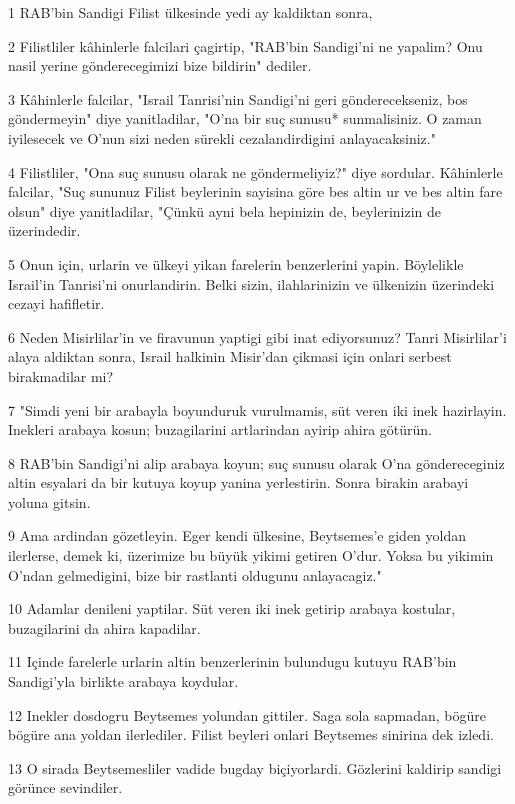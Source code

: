 \par 1 RAB'bin Sandigi Filist ülkesinde yedi ay kaldiktan sonra,
\par 2 Filistliler kâhinlerle falcilari çagirtip, "RAB'bin Sandigi'ni ne yapalim? Onu nasil yerine gönderecegimizi bize bildirin" dediler.
\par 3 Kâhinlerle falcilar, "Israil Tanrisi'nin Sandigi'ni geri gönderecekseniz, bos göndermeyin" diye yanitladilar, "O'na bir suç sunusu* sunmalisiniz. O zaman iyilesecek ve O'nun sizi neden sürekli cezalandirdigini anlayacaksiniz."
\par 4 Filistliler, "Ona suç sunusu olarak ne göndermeliyiz?" diye sordular. Kâhinlerle falcilar, "Suç sununuz Filist beylerinin sayisina göre bes altin ur ve bes altin fare olsun" diye yanitladilar, "Çünkü ayni bela hepinizin de, beylerinizin de üzerindedir.
\par 5 Onun için, urlarin ve ülkeyi yikan farelerin benzerlerini yapin. Böylelikle Israil'in Tanrisi'ni onurlandirin. Belki sizin, ilahlarinizin ve ülkenizin üzerindeki cezayi hafifletir.
\par 6 Neden Misirlilar'in ve firavunun yaptigi gibi inat ediyorsunuz? Tanri Misirlilar'i alaya aldiktan sonra, Israil halkinin Misir'dan çikmasi için onlari serbest birakmadilar mi?
\par 7 "Simdi yeni bir arabayla boyunduruk vurulmamis, süt veren iki inek hazirlayin. Inekleri arabaya kosun; buzagilarini artlarindan ayirip ahira götürün.
\par 8 RAB'bin Sandigi'ni alip arabaya koyun; suç sunusu olarak O'na göndereceginiz altin esyalari da bir kutuya koyup yanina yerlestirin. Sonra birakin arabayi yoluna gitsin.
\par 9 Ama ardindan gözetleyin. Eger kendi ülkesine, Beytsemes'e giden yoldan ilerlerse, demek ki, üzerimize bu büyük yikimi getiren O'dur. Yoksa bu yikimin O'ndan gelmedigini, bize bir rastlanti oldugunu anlayacagiz."
\par 10 Adamlar denileni yaptilar. Süt veren iki inek getirip arabaya kostular, buzagilarini da ahira kapadilar.
\par 11 Içinde farelerle urlarin altin benzerlerinin bulundugu kutuyu RAB'bin Sandigi'yla birlikte arabaya koydular.
\par 12 Inekler dosdogru Beytsemes yolundan gittiler. Saga sola sapmadan, bögüre bögüre ana yoldan ilerlediler. Filist beyleri onlari Beytsemes sinirina dek izledi.
\par 13 O sirada Beytsemesliler vadide bugday biçiyorlardi. Gözlerini kaldirip sandigi görünce sevindiler.
